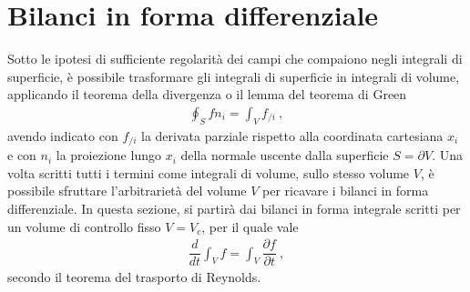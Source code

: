 \documentclass[letterpaper,10pt,italian]{jupyterBook}
\begin{document}
\section{Bilanci in forma differenziale}
\label{\detokenize{polimi/fluidmechanics-ita/template/capitoli/04_bilanci/04teoria:bilanci-in-forma-differenziale}}\label{\detokenize{polimi/fluidmechanics-ita/template/capitoli/04_bilanci/04teoria:fluid-mechanics-balance-differential}}
\sphinxAtStartPar
Sotto le ipotesi di sufficiente regolarità dei campi che compaiono negli
integrali di superficie, è possibile trasformare gli integrali di
superficie in integrali di volume, applicando il teorema della
divergenza o il lemma del teorema di Green
\begin{equation*}
\begin{split}\oint_{S} f n_i = \int_V f_{/i} \ ,\end{split}
\end{equation*}
\sphinxAtStartPar
avendo indicato con \(f_{/i}\) la
derivata parziale rispetto alla coordinata cartesiana \(x_i\) e con \(n_i\)
la proiezione lungo \(x_i\) della normale uscente dalla superficie
\(S=\partial V\). Una volta scritti tutti i termini come integrali di
volume, sullo stesso volume \(V\), è possibile sfruttare l’arbitrarietà
del volume \(V\) per ricavare i bilanci in forma differenziale. In questa
sezione, si partirà dai bilanci in forma integrale scritti per un volume
di controllo fisso \(V=V_c\), per il quale vale
\begin{equation*}
\begin{split}\dfrac{d}{d t} \int_V f = \int_V \dfrac{\partial f}{\partial t} \ ,\end{split}
\end{equation*}
\sphinxAtStartPar
secondo il teorema del trasporto di Reynolds.
\end{document}
